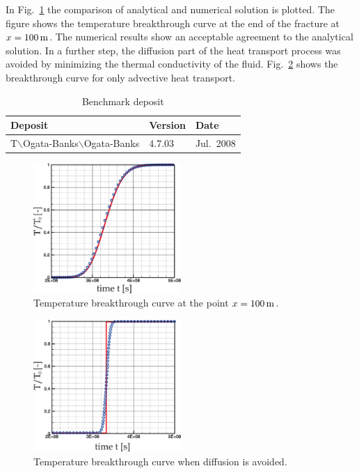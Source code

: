 In Fig.~\ref{fig-addiff-re1} the comparison of analytical and numerical solution is plotted. The figure shows the temperature breakthrough curve at the end of the fracture at $x=\unit[100]{m}$. The numerical results show an acceptable agreement to the analytical solution. In a further step, the diffusion part of the heat transport process was avoided by minimizing the thermal conductivity of the fluid. Fig.~\ref{fig-addiff-re2} shows the breakthrough curve for only advective heat transport.
\begin{table}[h]
\caption{Benchmark deposit}
\begin{center}
\begin{tabular}{lll}
\toprule
Deposit & Version & Date \\
\midrule
T$\backslash$Ogata-Banks$\backslash$Ogata-Banks & 4.7.03 & Jul.~2008 \\
\bottomrule
\end{tabular}
\end{center}
\end{table}
\begin{figure}[H]
\centering
\includegraphics[width=0.5\textwidth]{T/figures/Ad-Diff.eps}
\caption{\label{fig-addiff-re1}Temperature breakthrough curve at the point $x=\unit[100]{m}$.}
\end{figure}
\begin{figure}[h]
\centering
\includegraphics[width=0.5\textwidth]{T/figures/advection.eps}
\caption{\label{fig-addiff-re2}Temperature breakthrough curve when diffusion is avoided.}
\end{figure}
